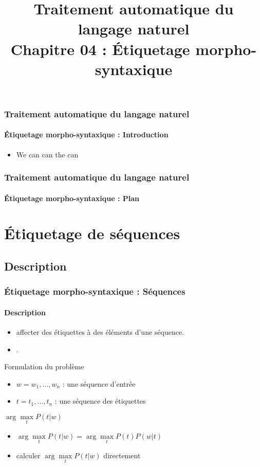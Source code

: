\documentclass[xcolor=table]{beamer}
\title[TALN : 04- Étiquetage morpho-syntaxique]%
{Traitement automatique du langage naturel\\Chapitre 04 : Étiquetage morpho-syntaxique}
\begin{document}
	
\begin{frame}
\frametitle{Traitement automatique du langage naturel}
\framesubtitle{Étiquetage morpho-syntaxique : Introduction}

\begin{itemize}
	\item We can can the can
	
\end{itemize}

\end{frame}


\begin{frame}
\frametitle{Traitement automatique du langage naturel}
\framesubtitle{Étiquetage morpho-syntaxique : Plan}

\begin{multicols}{2}
\tableofcontents
\end{multicols}
\end{frame}

\section{Étiquetage de séquences}

\subsection{Description}

\begin{frame}
\frametitle{Étiquetage morpho-syntaxique : Séquences}
\framesubtitle{Description}


\begin{itemize}
	\item {} affecter des étiquettes à des éléments d'une séquence. 
	\item {} .
\end{itemize}

\begin{block}{Formulation du problème}
	\begin{itemize}
		\item $w = w_1, \ldots, w_n$ : une séquence d'entrée
		\item $t = t_1, \ldots, t_n$ : une séquence des étiquettes
	\end{itemize}
	\begin{center}
		$ \arg\max\limits_t P(t | w)$
	\end{center}
	
	\begin{itemize}
		\item {} $ \arg\max\limits_t P(t | w) = \arg\max\limits_t P(t) P(w | t) $
		\item {} calculer $\arg\max\limits_t P(t | w)$ directement
	\end{itemize}
\end{block}

\end{frame}
\end{document}
